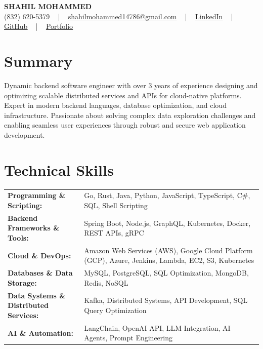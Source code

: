 \documentclass[letterpaper,11pt]{article}
\begin{document}
\begin{center}
    {\fontsize{14pt}{12pt}\selectfont \textbf{\MakeUppercase{Shahil Mohammed}}}\\ \vspace{2pt}
    \fontsize{10pt}{12pt}\selectfont (832) 620-5379 ~ | ~ \href{mailto:shahilmohammed14786@gmail.com}{shahilmohammed14786@gmail.com} ~ | ~  
    \href{https://www.linkedin.com/in/shahil-mohammed-9652931a1/}{\color{blue}\underline{LinkedIn}}  ~ | ~ 
    \href{https://github.com/freakbeast14}{\color{blue}\underline{GitHub}} ~ | ~ 
    \href{https://shahil-mohammed.netlify.app/}{\color{blue}\underline{Portfolio}}
    \vspace{-8pt}
\end{center}

\section{Summary}
\fontsize{9pt}{10pt}\selectfont
Dynamic backend software engineer with over 3 years of experience designing and optimizing scalable distributed services and APIs for cloud-native platforms. Expert in modern backend languages, database optimization, and cloud infrastructure. Passionate about solving complex data exploration challenges and enabling seamless user experiences through robust and secure web application development.
 \vspace{-5pt}
 
\section{Technical Skills}
        \vspace{-14pt}
        \begin{table}[h]
            \fontsize{9pt}{10pt}\selectfont
            \begin{tabular}{p{0.3\linewidth} p{0.7\linewidth}}
                \textbf{Programming \& Scripting:} & Go, Rust, Java, Python, JavaScript, TypeScript, C\#, SQL, Shell Scripting \\
                \textbf{Backend Frameworks \& Tools:} & Spring Boot, Node.js, GraphQL, Kubernetes, Docker, REST APIs, gRPC \\
                \textbf{Cloud \& DevOps:} & Amazon Web Services (AWS), Google Cloud Platform (GCP), Azure, Jenkins, Lambda, EC2, S3, Kubernetes \\
                \textbf{Databases \& Data Storage:} & MySQL, PostgreSQL, SQL Optimization, MongoDB, Redis, NoSQL \\
                \textbf{Data Systems \& Distributed Services:} & Kafka, Distributed Systems, API Development, SQL Query Optimization \\
                \textbf{AI \& Automation:} & LangChain, OpenAI API, LLM Integration, AI Agents, Prompt Engineering \\
            \end{tabular}
        \end{table}
 \vspace{-15pt}
 
\end{document}
